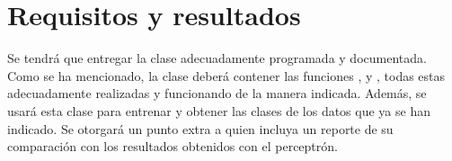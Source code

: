 \section{Requisitos y resultados}

Se tendrá que entregar la clase  adecuadamente programada y documentada. Como se ha mencionado, la clase deberá contener las funciones ,  y , todas estas adecuadamente realizadas y funcionando de la manera indicada. Además, se usará esta clase para entrenar y obtener las clases de los datos que ya se han indicado.  Se otorgará un punto extra a quien incluya un reporte de su comparación con los resultados obtenidos con el perceptrón.
